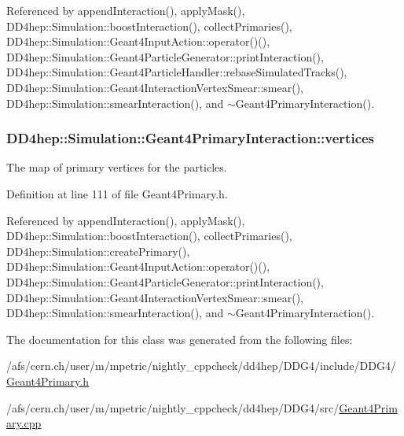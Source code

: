 Referenced by appendInteraction(), applyMask(), DD4hep::Simulation::boostInteraction(), collectPrimaries(), DD4hep::Simulation::Geant4InputAction::operator()(), DD4hep::Simulation::Geant4ParticleGenerator::printInteraction(), DD4hep::Simulation::Geant4ParticleHandler::rebaseSimulatedTracks(), DD4hep::Simulation::Geant4InteractionVertexSmear::smear(), DD4hep::Simulation::smearInteraction(), and $\sim$Geant4PrimaryInteraction().\hypertarget{class_d_d4hep_1_1_simulation_1_1_geant4_primary_interaction_aea4d776147c0e3d0503ee03de54932af}{
\subsubsection[{vertices}]{ {\bf DD4hep::Simulation::Geant4PrimaryInteraction::vertices}}}
\label{class_d_d4hep_1_1_simulation_1_1_geant4_primary_interaction_aea4d776147c0e3d0503ee03de54932af}


The map of primary vertices for the particles. 

Definition at line 111 of file Geant4Primary.h.

Referenced by appendInteraction(), applyMask(), DD4hep::Simulation::boostInteraction(), collectPrimaries(), DD4hep::Simulation::createPrimary(), DD4hep::Simulation::Geant4InputAction::operator()(), DD4hep::Simulation::Geant4ParticleGenerator::printInteraction(), DD4hep::Simulation::Geant4InteractionVertexSmear::smear(), DD4hep::Simulation::smearInteraction(), and $\sim$Geant4PrimaryInteraction().

The documentation for this class was generated from the following files:\begin{DoxyCompactItemize}
\item 
/afs/cern.ch/user/m/mpetric/nightly\_\-cppcheck/dd4hep/DDG4/include/DDG4/\hyperlink{_geant4_primary_8h}{Geant4Primary.h}\item 
/afs/cern.ch/user/m/mpetric/nightly\_\-cppcheck/dd4hep/DDG4/src/\hyperlink{_geant4_primary_8cpp}{Geant4Primary.cpp}\end{DoxyCompactItemize}
